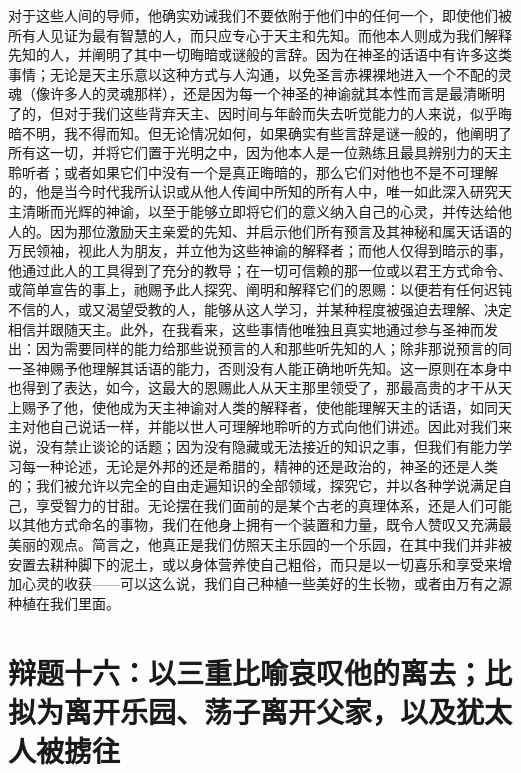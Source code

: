 对于这些人间的导师，他确实劝诫我们不要依附于他们中的任何一个，即使他们被所有人见证为最有智慧的人，而只应专心于天主和先知。而他本人则成为我们解释先知的人，并阐明了其中一切晦暗或谜般的言辞。因为在神圣的话语中有许多这类事情；无论是天主乐意以这种方式与人沟通，以免圣言赤裸裸地进入一个不配的灵魂（像许多人的灵魂那样），还是因为每一个神圣的神谕就其本性而言是最清晰明了的，但对于我们这些背弃天主、因时间与年龄而失去听觉能力的人来说，似乎晦暗不明，我不得而知。但无论情况如何，如果确实有些言辞是谜一般的，他阐明了所有这一切，并将它们置于光明之中，因为他本人是一位熟练且最具辨别力的天主聆听者；或者如果它们中没有一个是真正晦暗的，那么它们对他也不是不可理解的，他是当今时代我所认识或从他人传闻中所知的所有人中，唯一如此深入研究天主清晰而光辉的神谕，以至于能够立即将它们的意义纳入自己的心灵，并传达给他人的。因为那位激励天主亲爱的先知、并启示他们所有预言及其神秘和属天话语的万民领袖，视此人为朋友，并立他为这些神谕的解释者；而他人仅得到暗示的事，他通过此人的工具得到了充分的教导；在一切可信赖的那一位或以君王方式命令、或简单宣告的事上，祂赐予此人探究、阐明和解释它们的恩赐：以便若有任何迟钝不信的人，或又渴望受教的人，能够从这人学习，并某种程度被强迫去理解、决定相信并跟随天主。此外，在我看来，这些事情他唯独且真实地通过参与圣神而发出：因为需要同样的能力给那些说预言的人和那些听先知的人；除非那说预言的同一圣神赐予他理解其话语的能力，否则没有人能正确地听先知。这一原则在本身中也得到了表达，如今，这最大的恩赐此人从天主那里领受了，那最高贵的才干从天上赐予了他，使他成为天主神谕对人类的解释者，使他能理解天主的话语，如同天主对他自己说话一样，并能以世人可理解地聆听的方式向他们讲述。因此对我们来说，没有禁止谈论的话题；因为没有隐藏或无法接近的知识之事，但我们有能力学习每一种论述，无论是外邦的还是希腊的，精神的还是政治的，神圣的还是人类的；我们被允许以完全的自由走遍知识的全部领域，探究它，并以各种学说满足自己，享受智力的甘甜。无论摆在我们面前的是某个古老的真理体系，还是人们可能以其他方式命名的事物，我们在他身上拥有一个装置和力量，既令人赞叹又充满最美丽的观点。简言之，他真正是我们仿照天主乐园的一个乐园，在其中我们并非被安置去耕种脚下的泥土，或以身体营养使自己粗俗，而只是以一切喜乐和享受来增加心灵的收获——可以这么说，我们自己种植一些美好的生长物，或者由万有之源种植在我们里面。\par


\section{辩题十六：以三重比喻哀叹他的离去；比拟为离开乐园、荡子离开父家，以及犹太人被掳往}

